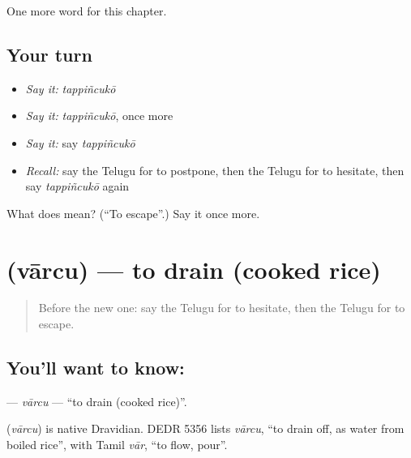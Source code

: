 \begin{grammarlens}[title={What you've built}]
One more word for this chapter.
\end{grammarlens}

\subsection*{Your turn}
\begin{itemize}
\raggedright
  \item \emph{Say it:} \emph{tappiñcukō}
  \item \emph{Say it:} \emph{tappiñcukō}, once more
  \item \emph{Say it:} say \emph{tappiñcukō}
  \item \emph{Recall:} say the Telugu for to postpone, then the Telugu for to hesitate, then say \emph{tappiñcukō} again
\end{itemize}

\begin{tcolorbox}[breakable,colback=teal!4,colframe=teal!35!black,title={Before you move on}]
What does  mean? (\textquotedblleft{}To escape\textquotedblright{}.) Say it once more.
\end{tcolorbox}
\section[\texorpdfstring{\te{వార్చు} (vārcu)}{వార్చు (vārcu)}]{ (vārcu) — to drain (cooked rice)}

\label{lesson:TE-C286-varcu}



\begin{quote}
Before the new one: say the Telugu for to hesitate, then the Telugu for to escape.
\end{quote}

\subsection*{You'll want to know: }
\textbf{} — \emph{vārcu} — \textquotedblleft{}to drain (cooked rice)\textquotedblright{}.

\begin{cousinweb}
\textbf{} (\emph{vārcu}) is native Dravidian. DEDR 5356 lists \emph{vārcu}, \textquotedblleft{}to drain off, as water from boiled rice\textquotedblright{}, with Tamil \emph{vār}, \textquotedblleft{}to flow, pour\textquotedblright{}.
\end{cousinweb}

